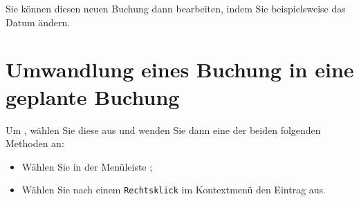 Sie können diesen neuen Buchung dann bearbeiten, indem Sie beispielsweise das Datum ändern.


\section{Umwandlung eines Buchung in eine geplante Buchung\label{transactions-schedule}}

Um , wählen Sie diese aus und wenden Sie dann eine der beiden folgenden Methoden an:
\begin{itemize}
	\item Wählen Sie in der Menüleiste ;
	\item Wählen Sie nach einem \texttt{Rechtsklick} im Kontextmenü den Eintrag  aus.
\end{itemize}

